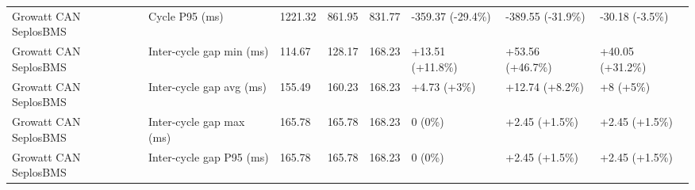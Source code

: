 \documentclass[11pt,a4paper]{article}
\newcommand{\increase}[1]{\textcolor{increasecolor}{#1}}
\newcommand{\decrease}[1]{\textcolor{decreasecolor}{#1}}
\begin{document}
\begin{landscape}
\begin{longtable}{@{}L{5.0cm}L{4.0cm}L{1.65cm}L{1.65cm}L{1.65cm}L{2.8cm}L{2.8cm}L{2.8cm}@{}}
Growatt CAN SeplosBMS & Cycle P95 (ms) & 1221.32 & 861.95 & 831.77 & \decrease{-359.37 (-29.4\%)} & \decrease{-389.55 (-31.9\%)} & \decrease{-30.18 (-3.5\%)} \\
Growatt CAN SeplosBMS & Inter-cycle gap min (ms) & 114.67 & 128.17 & 168.23 & \increase{+13.51 (+11.8\%)} & \increase{+53.56 (+46.7\%)} & \increase{+40.05 (+31.2\%)} \\
Growatt CAN SeplosBMS & Inter-cycle gap avg (ms) & 155.49 & 160.23 & 168.23 & \increase{+4.73 (+3\%)} & \increase{+12.74 (+8.2\%)} & \increase{+8 (+5\%)} \\
Growatt CAN SeplosBMS & Inter-cycle gap max (ms) & 165.78 & 165.78 & 168.23 & 0 (0\%) & \increase{+2.45 (+1.5\%)} & \increase{+2.45 (+1.5\%)} \\
Growatt CAN SeplosBMS & Inter-cycle gap P95 (ms) & 165.78 & 165.78 & 168.23 & 0 (0\%) & \increase{+2.45 (+1.5\%)} & \increase{+2.45 (+1.5\%)} \\
\bottomrule
\end{longtable}
\endgroup

\end{landscape}


\clearpage
\end{document}
